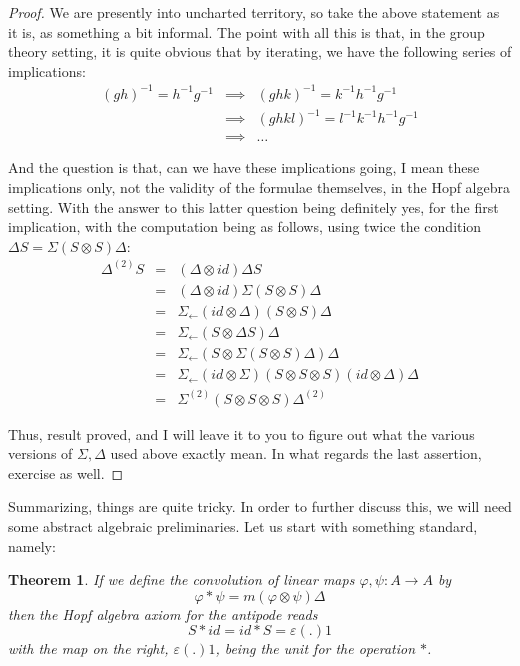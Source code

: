 \documentclass[12pt]{amsbook}
\newtheorem{theorem}{Theorem}[chapter]
\begin{document}
\begin{proof}
We are presently into uncharted territory, so take the above statement as it is, as something a bit informal. The point with all this is that, in the group theory setting, it is quite obvious that by iterating, we have the following series of implications:
\begin{eqnarray*}
(gh)^{-1}=h^{-1}g^{-1}
&\implies&(ghk)^{-1}=k^{-1}h^{-1}g^{-1}\\
&\implies&(ghkl)^{-1}=l^{-1}k^{-1}h^{-1}g^{-1}\\
&\implies&\ldots
\end{eqnarray*}

And the question is that, can we have these implications going, I mean these implications only, not the validity of the formulae themselves, in the Hopf algebra setting. With the answer to this latter question being definitely yes, for the first implication, with the computation being as follows, using twice the condition $\Delta S=\Sigma(S\otimes S)\Delta$:
\begin{eqnarray*}
\Delta^{(2)}S
&=&(\Delta\otimes id)\Delta S\\
&=&(\Delta\otimes id)\Sigma(S\otimes S)\Delta\\
&=&\Sigma_\leftarrow(id\otimes\Delta)(S\otimes S)\Delta\\
&=&\Sigma_\leftarrow(S\otimes\Delta S)\Delta\\
&=&\Sigma_\leftarrow(S\otimes\Sigma(S\otimes S)\Delta)\Delta\\
&=&\Sigma_\leftarrow(id\otimes\Sigma)(S\otimes S\otimes S)(id\otimes \Delta)\Delta\\
&=&\Sigma^{(2)}(S\otimes S\otimes S)\Delta^{(2)}
\end{eqnarray*}

Thus, result proved, and I will leave it to you to figure out what the various versions of $\Sigma,\Delta$ used above exactly mean. In what regards the last assertion, exercise as well.
\end{proof}

Summarizing, things are quite tricky. In order to further discuss this, we will need some abstract algebraic preliminaries. Let us start with something standard, namely:


\begin{theorem}
If we define the convolution of linear maps $\varphi,\psi:A\to A$ by
$$\varphi*\psi=m(\varphi\otimes\psi)\Delta$$
then the Hopf algebra axiom for the antipode reads
$$S*id=id*S=\varepsilon(.)1$$
with the map on the right, $\varepsilon(.)1$, being the unit for the operation $*$.
\end{theorem}
\end{document}
